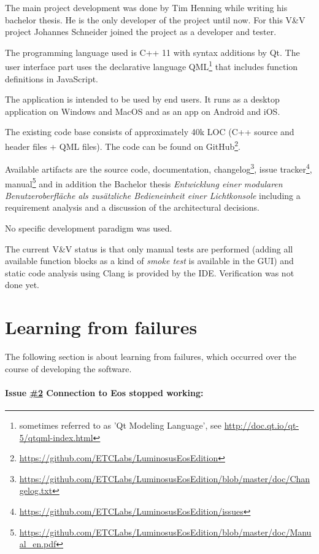 \documentclass{scrreprt}
\begin{document}
The main project development was done by Tim Henning while writing his bachelor thesis. He is the only developer of the project until now. For this V\&V project Johannes Schneider joined the project as a developer and tester.

The programming language used is C++ 11 with syntax additions by Qt. The user interface part uses the declarative language QML\footnote{ sometimes referred to as 'Qt Modeling Language', see \url{http://doc.qt.io/qt-5/qtqml-index.html}} that includes function definitions in JavaScript.

The application is intended to be used by end users. It runs as a desktop application on Windows and MacOS and as an app on Android and iOS.

The existing code base consists of approximately 40k LOC (C++ source and header files + QML files). The code can be found on GitHub\footnote{\url{https://github.com/ETCLabs/LuminosusEosEdition}}.

Available artifacts are the source code, documentation, changelog\footnote{\url{https://github.com/ETCLabs/LuminosusEosEdition/blob/master/doc/Changelog.txt}}, issue tracker\footnote{\url{https://github.com/ETCLabs/LuminosusEosEdition/issues}}, manual\footnote{\url{https://github.com/ETCLabs/LuminosusEosEdition/blob/master/doc/Manual_en.pdf}} and in addition the Bachelor thesis \textit{Entwicklung einer modularen Benutzeroberfl\"ache als zus\"atzliche Bedieneinheit einer Lichtkonsole} including a requirement analysis and a discussion of the architectural decisions.

No specific development paradigm was used.

The current V\&V status is that only manual tests are performed (adding all available function blocks as a kind of \textit{smoke test} is available in the GUI) and static code analysis using Clang is provided by the IDE. Verification was not done yet.

\section{Learning from failures}

The following section is about learning from failures, which occurred over the course of developing the software.

\paragraph{Issue \href{https://github.com/ETCLabs/LuminosusEosEdition/issues/2}{\#2} Connection to Eos stopped working:}
\end{document}
